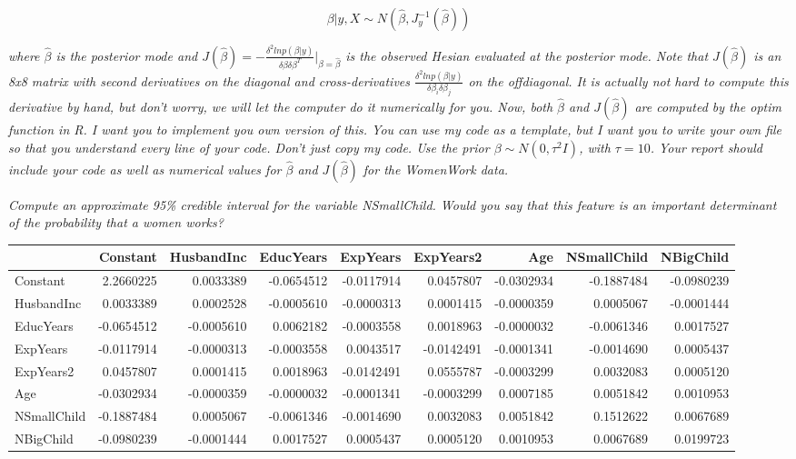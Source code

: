 \documentclass[]{article}
\begin{document}
\[\beta|y,X\sim N(\hat\beta,J_y^{-1}(\hat\beta))\]

\emph{where \(\hat\beta\) is the posterior mode and
\(J({\hat\beta}) = - \frac{\delta^2lnp(\beta|y)}{\delta\beta\delta\beta^{T}} |_{\beta={\hat\beta}}\)
is the observed Hesian evaluated at the posterior mode. Note that
\(J(\hat\beta)\) is an 8x8 matrix with second derivatives on the
diagonal and cross-derivatives
\(\frac{\delta^2lnp(\beta|y)}{\delta\beta_i\delta\beta_j}\) on the
offdiagonal. It is actually not hard to compute this derivative by hand,
but don't worry, we will let the computer do it numerically for you.
Now, both \(\hat\beta\) and \(J(\hat\beta)\) are computed by the optim
function in R. I want you to implement you own version of this. You can
use my code as a template, but I want you to write your own file so that
you understand every line of your code. Don't just copy my code. Use the
prior \(\beta\sim N(0,\tau^2I)\), with \(\tau=10\). Your report should
include your code as well as numerical values for \(\hat\beta\) and
\(J(\hat\beta)\) for the WomenWork data.}

\newpage

\emph{Compute an approximate 95\% credible interval for the variable
NSmallChild. Would you say that this feature is an important determinant
of the probability that a women works?}

\begin{longtable}[]{@{}lrrrrrrrr@{}}
\toprule
& Constant & HusbandInc & EducYears & ExpYears & ExpYears2 & Age &
NSmallChild & NBigChild\tabularnewline
\midrule
\endhead
Constant & 2.2660225 & 0.0033389 & -0.0654512 & -0.0117914 & 0.0457807 &
-0.0302934 & -0.1887484 & -0.0980239\tabularnewline
HusbandInc & 0.0033389 & 0.0002528 & -0.0005610 & -0.0000313 & 0.0001415
& -0.0000359 & 0.0005067 & -0.0001444\tabularnewline
EducYears & -0.0654512 & -0.0005610 & 0.0062182 & -0.0003558 & 0.0018963
& -0.0000032 & -0.0061346 & 0.0017527\tabularnewline
ExpYears & -0.0117914 & -0.0000313 & -0.0003558 & 0.0043517 & -0.0142491
& -0.0001341 & -0.0014690 & 0.0005437\tabularnewline
ExpYears2 & 0.0457807 & 0.0001415 & 0.0018963 & -0.0142491 & 0.0555787 &
-0.0003299 & 0.0032083 & 0.0005120\tabularnewline
Age & -0.0302934 & -0.0000359 & -0.0000032 & -0.0001341 & -0.0003299 &
0.0007185 & 0.0051842 & 0.0010953\tabularnewline
NSmallChild & -0.1887484 & 0.0005067 & -0.0061346 & -0.0014690 &
0.0032083 & 0.0051842 & 0.1512622 & 0.0067689\tabularnewline
NBigChild & -0.0980239 & -0.0001444 & 0.0017527 & 0.0005437 & 0.0005120
& 0.0010953 & 0.0067689 & 0.0199723\tabularnewline
\bottomrule
\end{longtable}
\end{document}
